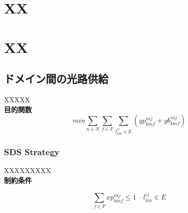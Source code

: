 \documentclass[a4j,twocolumn,fleqn]{jarticle}
\begin{document}
 
\Title
\section{XX}

\section{XX}

\subsection{ドメイン間の光路供給}
XXXXX\\

{\large \bf 目的関数}%
\begin{equation}
min \sum_{n \in N} \sum_{f \in F} \sum_{l^{ij}_{km} \in E}(yp^{nij}_{kmf} + yb^{nij}_{kmf})
\end{equation}
\subsubsection{SDS Strategy}
XXXXXXXXX\\
{\large \bf 制約条件}

\begin{equation}%
\sum_{f \in F}xp^{nij}_{kmf} \leq 1 \quad l^{ij}_{km} \in E
\end{equation}%
\end{document}
